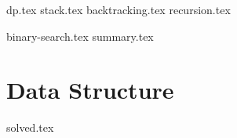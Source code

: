 \documentclass{../latex-setting/cmemoir}
\begin{document}

\frontmatter

\tableofcontents

\restoregeometry%

\mainmatter{}


{dp.tex}
{stack.tex}
{backtracking.tex}
{recursion.tex}

{binary-search.tex}
{summary.tex}



\part{Data Structure}

{solved.tex}
% 
\end{document}
